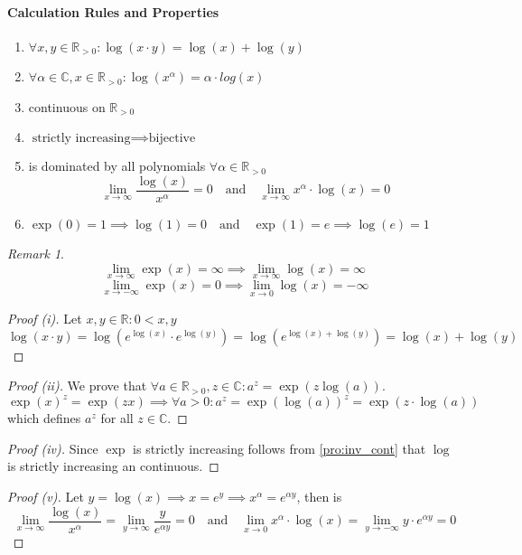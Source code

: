 \documentclass[english,titlepage]{uzhpub}
\theoremstyle{definition}
\theoremstyle{plain}
\theoremstyle{remark}
\newtheorem*{remark}{Remark}
\theoremstyle{example}
\begin{document}
   \paragraph{Calculation Rules and Properties}
   \begin{enumerate}[label=\roman*, align=Center]
      \item \(\forall x,y \in \mathbb{R}_{>0}: \log(x \cdot y) = \log(x) + \log(y)\)
      \item \(\forall \alpha \in \mathbb{C}, x \in \mathbb{R}_{>0}: \log(x^\alpha) = \alpha \cdot log(x)\)
      \item continuous on \(\mathbb{R}_{>0}\)
      \item \(\text{strictly increasing} \implies \text{bijective}\)
      \item is dominated by all polynomials \(\forall \alpha \in \mathbb{R}_{>0}\)
         \[\lim_{x \to \infty} \frac{\log(x)}{x^\alpha} = 0 \quad\text{and}\quad \lim_{x \to \infty} x^\alpha \cdot \log(x) = 0\]
      \item \(\exp(0) = 1 \implies \log(1) = 0 \quad\text{and}\quad \exp(1) = e \implies \log(e) = 1\)
   \end{enumerate}
   \begin{remark}
      \[\lim_{x \to \infty} \exp(x) = \infty \implies \lim_{x \to \infty} \log(x) = \infty\]
      \[\lim_{x \to -\infty} \exp(x) = 0 \implies \lim_{x \to 0} \log(x) = -\infty\]
   \end{remark}

   \begin{proof}[Proof (i)]
      Let \(x, y \in \mathbb{R}: 0 < x,y\)
      \[\log(x \cdot y) = \log(e^{\log(x)} \cdot e^{\log(y)}) = \log(e^{\log(x) + \log(y)}) = \log(x) + \log(y)\]
   \end{proof}
   \begin{proof}[Proof (ii)]
      We prove that \(\forall a \in \mathbb{R}_{>0}, z \in \mathbb{C}: a^z = \exp(z \log(a))\).
      \[\exp(x)^z = \exp(zx) \implies \forall a > 0: a^z = \exp(\log(a))^z = \exp(z \cdot \log(a))\]
      which defines \(a^z\) for all \(z \in \mathbb{C}\).
   \end{proof}
   \begin{proof}[Proof (iv)]
      Since \(\exp\) is strictly increasing follows from \cref{pro:inv_cont} that \(\log\) is strictly increasing an continuous.
   \end{proof}
   \begin{proof}[Proof (v)]
      Let \(y = \log(x) \implies x = e^y \implies x^\alpha = e^{\alpha y}\), then is
      \[\lim_{x \to \infty} \frac{\log(x)}{x^\alpha} = \lim_{y \to \infty} \frac{y}{e^{\alpha y}} = 0 \quad\text{and}\quad \lim_{x \to 0} x^\alpha \cdot \log(x) = \lim_{y \to -\infty} y \cdot e^{\alpha y} = 0\]
   \end{proof}
\end{document}
